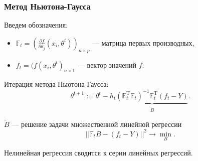 \documentclass[10pt,unicode, notheorems]{beamer}
\DeclareMathOperator{\T}{T}
\begin{document}
\begin{frame}
\frametitle{Метод Ньютона-Гаусса}
Введем обозначения:
\begin{itemize}
\item  $\mathbb{F}_{t}=(\frac{\partial f}{\partial\theta_{j}}(x_{i},\theta^{t}))_{n\times p}$ --- матрица первых производных,
\item  $f_{t}=(f(x_{i},\theta^{t})_{n\times 1}$ --- вектор значений $f$.
\end{itemize}

Итерация метода Ньютона-Гаусса:
\begin{equation*}
\theta^{t+1}:=
\theta^{t}
-
h_{t}\underbrace{(\mathbb{F}_{t}^{\T}\mathbb{F}_{t})^{-1}\mathbb{F}_{t}^{\T}(f_{t}-Y)}_{\widetilde{B}}.
\end{equation*}

$\widetilde{B}$ --- решение задачи множественной линейной регрессии
\begin{equation*}
||\mathbb{F}_{t}B-(f_{t}-Y)||^{2}
\to
\min_{B}.
\end{equation*}

Нелинейная регрессия сводится к серии линейных регрессий.

\end{frame}
\end{document}
